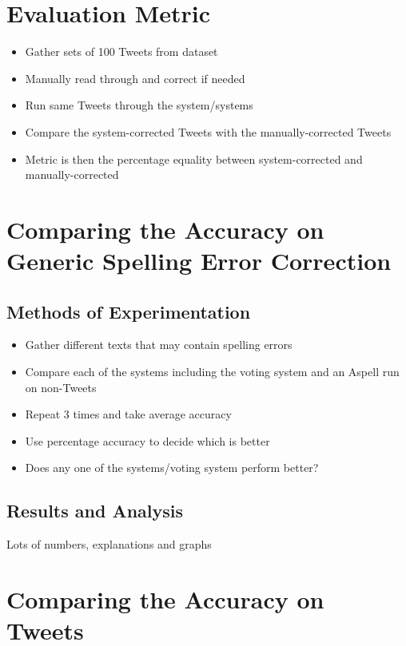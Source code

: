 \section{Evaluation Metric}


\begin{itemize}
	\item Gather sets of 100 Tweets from dataset
	\item Manually read through and correct if needed
	\item Run same Tweets through the system/systems
	\item Compare the system-corrected Tweets with the manually-corrected Tweets
	\item Metric is then the percentage equality between system-corrected and manually-corrected
\end{itemize}

\section{Comparing the Accuracy on Generic Spelling Error Correction}

\subsection{Methods of Experimentation}
\begin{itemize}
	\item Gather different texts that may contain spelling errors
	\item Compare each of the systems including the voting system and an Aspell run on non-Tweets
	\item Repeat 3 times and take average accuracy
	\item Use percentage accuracy to decide which is better
	\item Does any one of the systems/voting system perform better?
\end{itemize}

\subsection{Results and Analysis}
Lots of numbers, explanations and graphs

\section{Comparing the Accuracy on Tweets}
